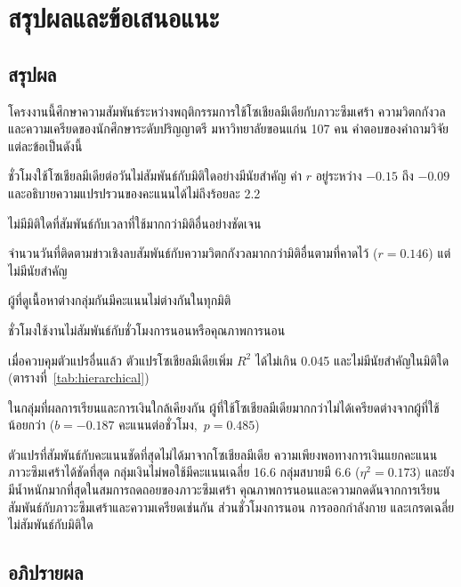 \chapter{สรุปผลและข้อเสนอแนะ}

\section{สรุปผล}

โครงงานนี้ศึกษาความสัมพันธ์ระหว่างพฤติกรรมการใช้โซเชียลมีเดียกับภาวะซึมเศร้า ความวิตกกังวล
และความเครียดของนักศึกษาระดับปริญญาตรี มหาวิทยาลัยขอนแก่น 107 คน
คำตอบของคำถามวิจัยแต่ละข้อเป็นดังนี้

\begin{subitems}
    \item ชั่วโมงใช้โซเชียลมีเดียต่อวันไม่สัมพันธ์กับมิติใดอย่างมีนัยสำคัญ ค่า $r$ อยู่ระหว่าง $-0.15$ ถึง $-0.09$ และอธิบายความแปรปรวนของคะแนนได้ไม่ถึงร้อยละ 2.2
    \item ไม่มีมิติใดที่สัมพันธ์กับเวลาที่ใช้มากกว่ามิติอื่นอย่างชัดเจน
    \item จำนวนวันที่ติดตามข่าวเชิงลบสัมพันธ์กับความวิตกกังวลมากกว่ามิติอื่นตามที่คาดไว้ ($r = 0.146$) แต่ไม่มีนัยสำคัญ
    \item ผู้ที่ดูเนื้อหาต่างกลุ่มกันมีคะแนนไม่ต่างกันในทุกมิติ
    \item ชั่วโมงใช้งานไม่สัมพันธ์กับชั่วโมงการนอนหรือคุณภาพการนอน
    \item เมื่อควบคุมตัวแปรอื่นแล้ว ตัวแปรโซเชียลมีเดียเพิ่ม $R^2$ ได้ไม่เกิน 0.045 และไม่มีนัยสำคัญในมิติใด (ตารางที่~\ref{tab:hierarchical})
    \item ในกลุ่มที่ผลการเรียนและการเงินใกล้เคียงกัน ผู้ที่ใช้โซเชียลมีเดียมากกว่าไม่ได้เครียดต่างจากผู้ที่ใช้น้อยกว่า ($b = -0.187$ คะแนนต่อชั่วโมง,~$p = 0.485$)
\end{subitems}

ตัวแปรที่สัมพันธ์กับคะแนนชัดที่สุดไม่ได้มาจากโซเชียลมีเดีย
ความเพียงพอทางการเงินแยกคะแนนภาวะซึมเศร้าได้ชัดที่สุด
กลุ่มเงินไม่พอใช้มีคะแนนเฉลี่ย 16.6 กลุ่มสบายมี 6.6 ($\eta^2 = 0.173$)
และยังมีน้ำหนักมากที่สุดในสมการถดถอยของภาวะซึมเศร้า
คุณภาพการนอนและความกดดันจากการเรียนสัมพันธ์กับภาวะซึมเศร้าและความเครียดเช่นกัน
ส่วนชั่วโมงการนอน การออกกำลังกาย และเกรดเฉลี่ยไม่สัมพันธ์กับมิติใด

\section{อภิปรายผล}


